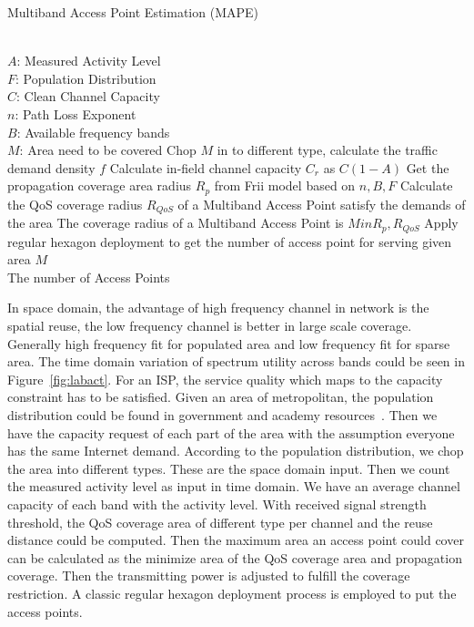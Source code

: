 \begin{algorithm}[t]
\small
\caption{Multiband Access Point Estimation (MAPE)}
\label{algorithm:mape}
\begin{algorithmic}[1]
\REQUIRE  ~~\\
$A$: Measured Activity Level \\
$F$: Population Distribution\\
$C$: Clean Channel Capacity\\
$n$: Path Loss Exponent \\
$B$: Available frequency bands\\
$M$: Area need to be covered
\STATE Chop $M$ in to different type, calculate the traffic demand density $f$
\STATE Calculate in-field channel capacity $C_r$ as $C(1-A)$
\STATE Get the propagation coverage area radius $R_p$ from Frii model based on $n,B,F$
\STATE Calculate the QoS coverage radius $R_{QoS}$ of a Multiband Access Point satisfy the demands of the area
\STATE The coverage radius of a Multiband Access Point is $Min{R_p,R_{QoS}}$
\STATE Apply regular hexagon deployment to get the number of access point for serving given area $M$
\ENSURE ~~\\
The number of Access Points\\
\end{algorithmic}
\end{algorithm}

In space domain, the advantage of high frequency channel in network is the spatial reuse, the low
frequency channel is better in large scale coverage. Generally high frequency fit
for populated area and low frequency fit for sparse area.
The time domain variation of spectrum utility across bands could be seen in Figure~\ref{fig:labact}.
For an ISP, the service quality which maps to the capacity constraint has to be satisfied.
Given an area of metropolitan, the population distribution could be found in 
government and academy resources~\cite{uscensus}. Then we have the capacity request
of each part of the area with the assumption everyone has the same Internet demand. 
According to the population distribution, we chop the area into different types.
These are the space domain input. Then we count the measured activity level as 
input in time domain. We have an average channel capacity of each band with the 
activity level. With received signal strength threshold, 
the QoS coverage area of different type per channel and the reuse distance could be computed. 
Then the maximum area an access point could cover can be calculated as the minimize 
area of the QoS coverage area and propagation coverage.
Then the transmitting power is adjusted to fulfill the coverage restriction. 
A classic regular hexagon deployment process is employed to put the access points.





